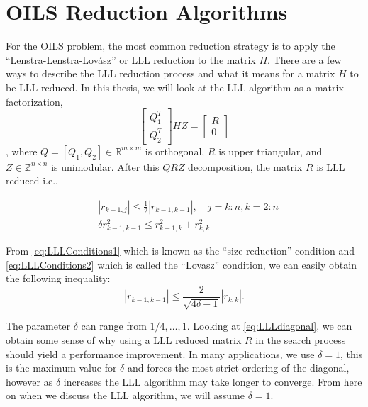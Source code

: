 \documentclass[12pt,Bold,letterpaper]{mcgilletdclass}
\newcommand{\vsp}{\vspace{\baselineskip}}
\begin{document}
\vsp \section{OILS Reduction Algorithms} \label{sec:oilsreduction}
For the OILS problem, the most common reduction strategy is to apply the ``Lenstra-Lenstra-Lovász'' or LLL reduction \cite{LenLL82} to the matrix $H$. There are a few ways to describe the LLL reduction process and what it means for a matrix $H$ to be LLL reduced. In this thesis, we will look at the LLL algorithm as a matrix factorization, 
$$\begin{bmatrix}
Q_1^T\\ 
Q_2^T
\end{bmatrix}
HZ = 
\begin{bmatrix}
R\\ 
0
\end{bmatrix}$$,
where $Q = [Q_1, Q_2] \in \mathbb{R}^{m \times m} $ is orthogonal, $R$ is upper triangular, and $Z \in \mathbb{Z}^{n \times n}$ is unimodular. After this $QRZ$ decomposition, the matrix $R$ is LLL reduced i.e.,

\begin{align} \label{eq:LLLConditions1}
&\left | r_{k-1,j} \right | \le \frac{1}{2} \left | r_{k-1,k-1} \right |, \quad
j = k:n, k=2:n \\
\label{eq:LLLConditions2}
&\delta r_{k-1,k-1}^2 \le r_{k-1,k}^2 + r_{k,k}^2
\end{align}

From \eqref{eq:LLLConditions1} which is known as the ``size reduction''
condition and \eqref{eq:LLLConditions2} which is called the ``Lovasz''
condition, we can easily obtain the following inequality:
\begin{equation} \label{eq:LLLdiagonal}
\left | r_{k-1,k-1} \right | \le \frac{2}{\sqrt{4\delta -1}}\left | r_{k,k} \right |.
\end{equation}

The parameter $\delta$ can range from $1/4, \dots , 1$. Looking at
\eqref{eq:LLLdiagonal}, we can obtain some sense of why using a LLL reduced
matrix $R$ in the search process should yield a performance improvement. In many
applications, we use $\delta=1$, this is the maximum value for $\delta$ and
forces the most strict ordering of the diagonal, however as $\delta$ increases the LLL algorithm may take longer to converge. From here on when we discuss the LLL algorithm, we will assume $\delta = 1$.
\end{document}
